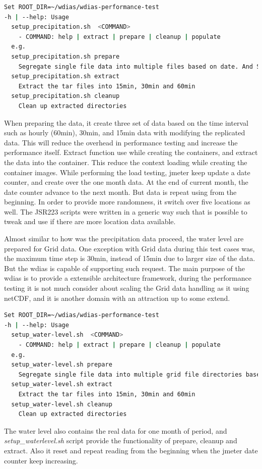 \begin{lstlisting}[language=sh, caption=Precipitation Data Preparation]
Set ROOT_DIR=~/wdias/wdias-performance-test
-h | --help: Usage
  setup_precipitation.sh  <COMMAND>
    - COMMAND: help | extract | prepare | cleanup | populate
  e.g.
  setup_precipitation.sh prepare
    Segregate single file data into multiple files based on date. And Separate into main directories of 15min, 30min, 60min and create tar files
  setup_precipitation.sh extract
    Extract the tar files into 15min, 30min and 60min
  setup_precipitation.sh cleanup
    Clean up extracted directories
\end{lstlisting}
When preparing the data, it create three set of data based on the time interval such as hourly (60min), 30min, and 15min data with modifying the replicated data.
This will reduce the overhead in performance testing and increase the performance itself.
Extract function use while creating the containers, and extract the data into the container. This reduce the context loading while creating the container images.
While performing the load testing, \acrshort{jmeter} keep update a date counter, and create over the one month data. At the end of current month, the date counter advance to the next month. But data is repeat using from the beginning. In order to provide more randomness, it switch over five locations as well. The JSR223 scripts were written in a generic way such that is possible to tweak and use if there are more location data available.

Almost similar to how was the precipitation data proceed, the water level are prepared for Grid data. One exception with Grid data during this test cases was, the maximum time step is 30min, instead of 15min due to larger size of the data. But the \acrshort{wdias} is capable of supporting such request. The main purpose of the \acrshort{wdias} is to provide a extensible architecture framework, during the performance testing it is not much consider about scaling the Grid data handling as it using \acrshort{netCDF}, and it is another domain with an attraction up to some extend.

\begin{lstlisting}[language=sh, caption=Water level Data Preparation]
Set ROOT_DIR=~/wdias/wdias-performance-test
-h | --help: Usage
  setup_water-level.sh  <COMMAND>
    - COMMAND: help | extract | prepare | cleanup | populate
  e.g.
  setup_water-level.sh prepare
    Segregate single file data into multiple grid file directories based on date. And Separate into main directories of 15min, 30min, 60min and create tar files
  setup_water-level.sh extract
    Extract the tar files into 15min, 30min and 60min
  setup_water-level.sh cleanup
    Clean up extracted directories
\end{lstlisting}
The water level also contains the real data for one month of period, and \emph{setup\_waterlevel.sh} script provide the functionality of prepare, cleanup and extract.
Also it reset and repeat reading from the beginning when the \acrshort{jmeter} date counter keep increasing.


